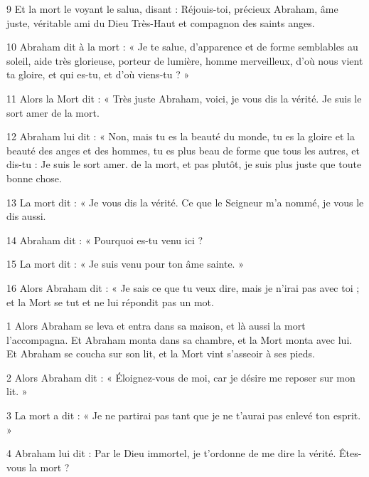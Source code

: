 \par 9 Et la mort le voyant le salua, disant : Réjouis-toi, précieux Abraham, âme juste, véritable ami du Dieu Très-Haut et compagnon des saints anges.

\par 10 Abraham dit à la mort : « Je te salue, d'apparence et de forme semblables au soleil, aide très glorieuse, porteur de lumière, homme merveilleux, d'où nous vient ta gloire, et qui es-tu, et d'où viens-tu ? »

\par 11 Alors la Mort dit : « Très juste Abraham, voici, je vous dis la vérité. Je suis le sort amer de la mort.

\par 12 Abraham lui dit : « Non, mais tu es la beauté du monde, tu es la gloire et la beauté des anges et des hommes, tu es plus beau de forme que tous les autres, et dis-tu : Je suis le sort amer. de la mort, et pas plutôt, je suis plus juste que toute bonne chose.

\par 13 La mort dit : « Je vous dis la vérité. Ce que le Seigneur m’a nommé, je vous le dis aussi.

\par 14 Abraham dit : « Pourquoi es-tu venu ici ?

\par 15 La mort dit : « Je suis venu pour ton âme sainte. »

\par 16 Alors Abraham dit : « Je sais ce que tu veux dire, mais je n'irai pas avec toi ; et la Mort se tut et ne lui répondit pas un mot.


\par 1 Alors Abraham se leva et entra dans sa maison, et là aussi la mort l'accompagna. Et Abraham monta dans sa chambre, et la Mort monta avec lui. Et Abraham se coucha sur son lit, et la Mort vint s'asseoir à ses pieds.

\par 2 Alors Abraham dit : « Éloignez-vous de moi, car je désire me reposer sur mon lit. »

\par 3 La mort a dit : « Je ne partirai pas tant que je ne t'aurai pas enlevé ton esprit. »

\par 4 Abraham lui dit : Par le Dieu immortel, je t'ordonne de me dire la vérité. Êtes-vous la mort ?

